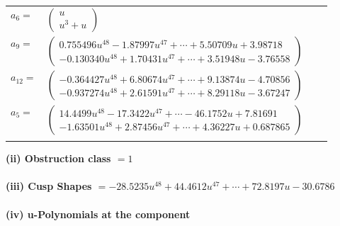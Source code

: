 \documentclass[1p]{elsarticle_modified}
\theoremstyle{definition}
\begin{document}
\begin{tabular}{m{7pt} m{180pt} m{7pt} m{180pt} }
\flushright $a_{6}=$&$\begin{pmatrix}u\\u^3+u\end{pmatrix}$ \\
\flushright $a_{9}=$&$\begin{pmatrix}0.755496 u^{48}-1.87997 u^{47}+\cdots+5.50709 u+3.98718\\-0.130340 u^{48}+1.70431 u^{47}+\cdots+3.51948 u-3.76558\end{pmatrix}$ \\
\flushright $a_{12}=$&$\begin{pmatrix}-0.364427 u^{48}+6.80674 u^{47}+\cdots+9.13874 u-4.70856\\-0.937274 u^{48}+2.61591 u^{47}+\cdots+8.29118 u-3.67247\end{pmatrix}$ \\
\flushright $a_{5}=$&$\begin{pmatrix}14.4499 u^{48}-17.3422 u^{47}+\cdots-46.1752 u+7.81691\\-1.63501 u^{48}+2.87456 u^{47}+\cdots+4.36227 u+0.687865\end{pmatrix}$\\&\end{tabular}
\flushleft \textbf{(ii) Obstruction class $= 1$}\\~\\
\flushleft \textbf{(iii) Cusp Shapes $= -28.5235 u^{48}+44.4612 u^{47}+\cdots+72.8197 u-30.6786$}\\~\\
\newpage\renewcommand{\arraystretch}{1}
\flushleft \textbf{(iv) u-Polynomials at the component}\newline \\
\end{document}
